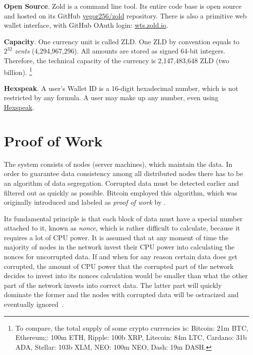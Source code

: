 \documentclass[11pt,oneside]{article}
\begin{document}
\textbf{Open Source}.
Zold is a command line tool. Its entire code base is open source
and hosted on its GitHub \href{https://github.com/yegor256/zold}{yegor256/zold}
repository. There is also a primitive web wallet interface, with
GitHub OAuth login: \href{https://wts.zold.io}{wts.zold.io}.

\textbf{Capacity}.
One currency unit is called ZLD.
One ZLD by convention equals to $2^{32}$ \emph{zents} (4,294,967,296).
All amounts are stored as signed 64-bit integers.
Therefore, the technical capacity of the currency is 2,147,483,648 ZLD (two billion).%
\footnote{%
  To compare, the total supply of some crypto currencies is:
  Bitcoin: 21m BTC,
  Ethereum;: 100m ETH,
  Ripple: 100b XRP,
  Litecoin: 84m LTC,
  Cardano: 31b ADA,
  Stellar: 103b XLM,
  NEO: 100m NEO,
  Dash: 19m DASH.
}

\textbf{Hexspeak}.
A user's Wallet ID is a 16-digit hexadecimal number, which is not restricted by any formula.
A user may make up any number, even using
\href{https://en.wikipedia.org/wiki/Hexspeak}{Hexspeak}.

\section{Proof of Work}\label{sec:score}

The system consists of nodes (server machines), which maintain the data.
In order to guarantee data consistency among all distributed nodes
there has to be an algorithm of data segregation.
Corrupted data must be detected earlier and filtered out as quickly as possible.
Bitcoin employed this algorithm, which was originally introduced and labeled as
\emph{proof of work} by \textcite{back1997}.

Its fundamental principle is that each block of data must have a special
number attached to it, known as \emph{nonce}, which is rather difficult to calculate,
because it requires a lot of CPU power. It is assumed that at any moment
of time the majority of nodes in the network invest their CPU power into
calculating the nonces for uncorrupted data. If and when for any reason
certain data does get corrupted, the amount of CPU power that the corrupted part of the network
decides to invest into its nonces calculation would be smaller than what
the other part of the network invests into correct data. The latter part
will quickly dominate the former and the nodes with corrupted data will
be ostracized and eventually ignored~\parencite{nakamoto2008}.
\end{document}
